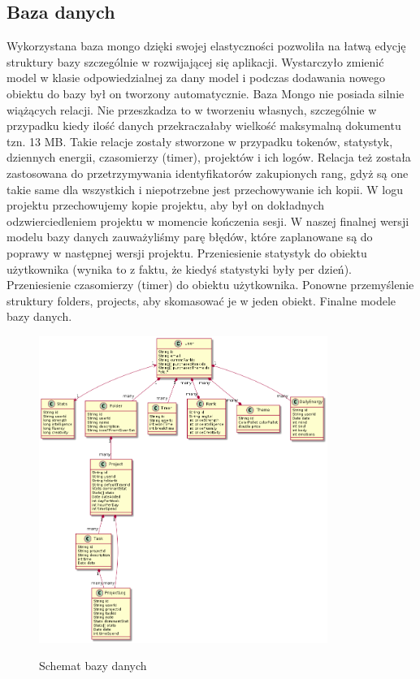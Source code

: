 \documentclass[a4paper,11pt]{report}
\begin{document}
\subsection{Baza danych}
Wykorzystana baza mongo dzięki swojej elastyczności pozwoliła na łatwą edycję struktury bazy szczególnie w rozwijającej się aplikacji.
Wystarczyło zmienić model w klasie odpowiedzialnej za dany model i podczas dodawania nowego obiektu do bazy był on tworzony automatycznie.
Baza Mongo nie posiada silnie wiążących relacji. 
Nie przeszkadza to w tworzeniu własnych, szczególnie w przypadku kiedy ilość danych przekraczałaby wielkość maksymalną dokumentu tzn. 13 MB.
Takie relacje zostały stworzone w przypadku tokenów, statystyk, dziennych energii, czasomierzy (timer), projektów i ich logów. Relacja też została zastosowana do przetrzymywania identyfikatorów zakupionych rang, gdyż są one takie same dla wszystkich i niepotrzebne jest przechowywanie ich kopii.
W logu projektu przechowujemy kopie projektu, aby był on dokładnych odzwierciedleniem projektu w momencie kończenia sesji. W naszej finalnej wersji modelu bazy danych zauważyliśmy parę błędów, które zaplanowane są do poprawy w następnej wersji projektu.
Przeniesienie statystyk do obiektu użytkownika (wynika to z faktu, że kiedyś statystyki były per dzień). Przeniesienie czasomierzy (timer) do obiektu użytkownika. Ponowne przemyślenie struktury folders, projects, aby skomasować je w jeden obiekt.
Finalne modele bazy danych.
\begin{figure}[h]
	\centering
	\includegraphics[width=\textwidth, height=10cm]{gamitude_database_model}\\
	\caption{Schemat bazy danych}
	\label{fig:db}
\end{figure}
\end{document}
